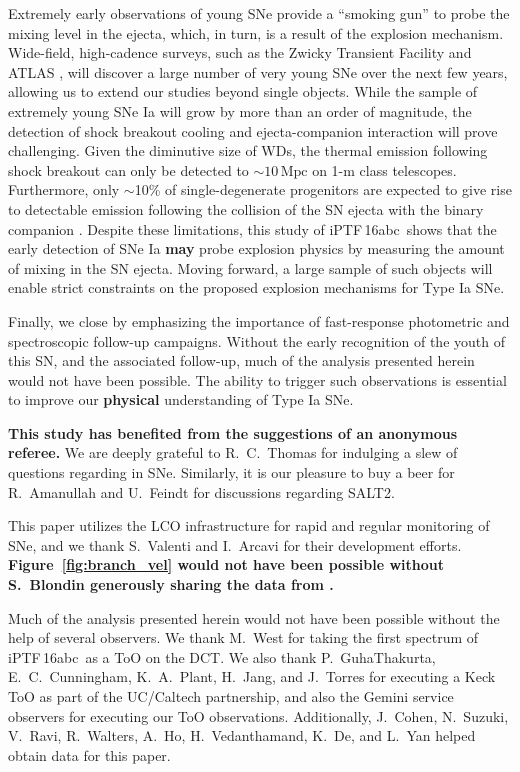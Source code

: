 \documentclass[twocolumn]{aastex61}
\newcommand{\abc}{iPTF\,16abc}
\begin{document}
Extremely early observations of young SNe provide a ``smoking
gun'' to probe the mixing level in the ejecta, which, in turn, is 
a result of the explosion mechanism. Wide-field, high-cadence surveys, such as the Zwicky Transient Facility \citep{2016PASP..128h4501B} and ATLAS \citep{2011PASP..123...58T,2013RSPTA.37120269T}, will discover a large number of very young SNe over the next few years, allowing us to extend our studies beyond single objects. While the sample of extremely young SNe Ia will grow by more than an order of magnitude, the detection of shock breakout cooling and ejecta-companion interaction will prove challenging. Given the diminutive size of WDs, the thermal emission following shock breakout can only be detected to $\sim 10\,\mathrm{Mpc}$ on 1-m class telescopes. Furthermore, only $\sim$10\% of single-degenerate progenitors are expected to give rise to detectable emission following the collision of the SN ejecta with the binary companion \citep{2010ApJ...708.1025K}. Despite these limitations, this study of \abc\ shows that the early detection of SNe Ia \textbf{may} probe explosion physics by measuring the amount of mixing in the SN ejecta. Moving forward, a large sample of such objects will enable strict constraints on the proposed explosion mechanisms for Type Ia SNe.

Finally, we close by emphasizing the importance of fast-response photometric and spectroscopic follow-up campaigns. Without the early recognition of the youth of this SN, and the associated follow-up, much of the analysis presented herein would not have been possible. The ability to trigger such observations is essential to improve our \textbf{physical} understanding of Type Ia SNe.

\acknowledgements

\textbf{This study has benefited from the suggestions of an anonymous
referee.} We are deeply grateful to R.~C.~Thomas for indulging a slew of
questions regarding  in SNe. Similarly, it is our pleasure to buy a
beer for R.~Amanullah and U.~Feindt for discussions regarding SALT2.

This paper utilizes the LCO infrastructure for rapid and regular monitoring of
SNe, and we thank S.~Valenti and I.~Arcavi for their development efforts.
\textbf{Figure~\ref{fig:branch_vel} would not have been possible without
S.~Blondin generously sharing the data from \citet{2012AJ....143..126B}.}

Much of the analysis presented herein would not have been possible without the
help of several observers. We thank M.~West for taking the first spectrum of
\abc\ as a ToO on the DCT. We also thank P.~GuhaThakurta, E.~C.~Cunningham,
K.~A.~Plant, H.~Jang, and J.~Torres for executing a Keck ToO as part of the
UC/Caltech partnership, and also the Gemini service observers for executing
our ToO observations. Additionally, J.~Cohen, N.~Suzuki, V.~Ravi, R.~Walters,
A.~Ho, H.~Vedanthamand, K.~De, and L.~Yan helped obtain data for this paper.
\end{document}
